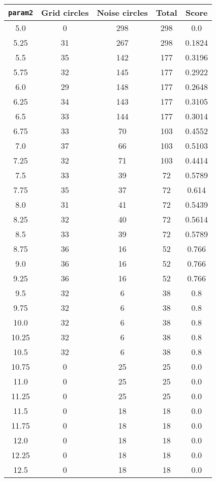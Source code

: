 \documentclass[letterpaper, 12pt]{article}
\begin{document}
\begin{longtable}{|c|c|c|c|c|}
\hline
\textbf{\texttt{param2}} & \textbf{Grid circles} & \textbf{Noise circles} & \textbf{Total} & \textbf{Score} \\
\hline
5.0 & 0 & 298 & 298 & 0.0 \\
\hline
5.25 & 31 & 267 & 298 & 0.1824 \\
\hline
5.5 & 35 & 142 & 177 & 0.3196 \\
\hline
5.75 & 32 & 145 & 177 & 0.2922 \\
\hline
6.0 & 29 & 148 & 177 & 0.2648 \\
\hline
6.25 & 34 & 143 & 177 & 0.3105 \\
\hline
6.5 & 33 & 144 & 177 & 0.3014 \\
\hline
6.75 & 33 & 70 & 103 & 0.4552 \\
\hline
7.0 & 37 & 66 & 103 & 0.5103 \\
\hline
7.25 & 32 & 71 & 103 & 0.4414 \\
\hline
7.5 & 33 & 39 & 72 & 0.5789 \\
\hline
7.75 & 35 & 37 & 72 & 0.614 \\
\hline
8.0 & 31 & 41 & 72 & 0.5439 \\
\hline
8.25 & 32 & 40 & 72 & 0.5614 \\
\hline
8.5 & 33 & 39 & 72 & 0.5789 \\
\hline
8.75 & 36 & 16 & 52 & 0.766 \\
\hline
9.0 & 36 & 16 & 52 & 0.766 \\
\hline
9.25 & 36 & 16 & 52 & 0.766 \\
\hline
9.5 & 32 & 6 & 38 & 0.8 \\
\hline
9.75 & 32 & 6 & 38 & 0.8 \\
\hline
10.0 & 32 & 6 & 38 & 0.8 \\
\hline
10.25 & 32 & 6 & 38 & 0.8 \\
\hline
10.5 & 32 & 6 & 38 & 0.8 \\
\hline
10.75 & 0 & 25 & 25 & 0.0 \\
\hline
11.0 & 0 & 25 & 25 & 0.0 \\
\hline
11.25 & 0 & 25 & 25 & 0.0 \\
\hline
11.5 & 0 & 18 & 18 & 0.0 \\
\hline
11.75 & 0 & 18 & 18 & 0.0 \\
\hline
12.0 & 0 & 18 & 18 & 0.0 \\
\hline
12.25 & 0 & 18 & 18 & 0.0 \\
\hline
12.5 & 0 & 18 & 18 & 0.0 \\

\end{longtable}
\end{document}
